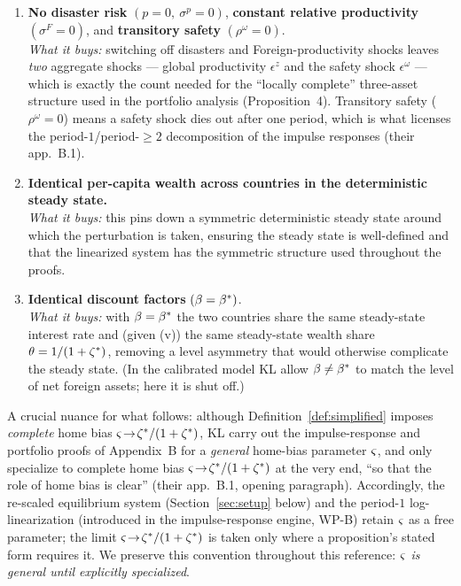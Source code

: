 \begin{definition}
\begin{enumerate}[label=(\roman*),leftmargin=2.0em,itemsep=3pt]
  $\Phi(\ell)$ linear in the relevant sense, simplifying the supply block.
  \item \textbf{No disaster risk} $(p=0,\ \sigma^p=0)$, \textbf{constant relative
  productivity} $(\sigma^F=0)$, and \textbf{transitory safety}
  $(\rho^\omega=0)$. \\[2pt]
  \emph{What it buys:} switching off disasters and Foreign-productivity shocks
  leaves \emph{two} aggregate shocks --- global productivity $\epsilon^z$ and the
  safety shock $\epsilon^\omega$ --- which is exactly the count needed for the
  ``locally complete'' three-asset structure used in the portfolio analysis
  (Proposition~4). Transitory safety ($\rho^\omega=0$) means a safety shock dies
  out after one period, which is what licenses the period-$1$/period-$\ge 2$
  decomposition of the impulse responses (their app.\ B.1).
  \item \textbf{Identical per-capita wealth across countries in the
  deterministic steady state.} \\[2pt]
  \emph{What it buys:} this pins down a symmetric deterministic steady state
  around which the perturbation is taken, ensuring the steady state is
  well-defined and that the linearized system has the symmetric structure used
  throughout the proofs.
  \item \textbf{Identical discount factors} $(\beta=\beta^{*})$. \\[2pt]
  \emph{What it buys:} with $\beta=\beta^{*}$ the two countries share the same
  steady-state interest rate and (given (v)) the same steady-state wealth share
  $\theta=1/(1+\zeta^{*})$, removing a level asymmetry that would otherwise complicate
  the steady state. (In the calibrated model KL allow $\beta\neq\beta^{*}$ to match
  the level of net foreign assets; here it is shut off.)
\end{enumerate}
\end{definition}

\begin{remark}
\label{rem:general-sigma}
A crucial nuance for what follows: although Definition~\ref{def:simplified}
imposes \emph{complete} home bias $\varsigma\!\to\!\zeta^{*}/(1+\zeta^{*})$, KL carry out the
impulse-response and portfolio proofs of Appendix~B for a \emph{general}
home-bias parameter $\varsigma$, and only specialize to complete home bias
$\varsigma\!\to\!\zeta^{*}/(1+\zeta^{*})$ at the very end, ``so that the role of home bias is
clear'' (their app.\ B.1, opening paragraph). Accordingly, the re-scaled
equilibrium system (Section~\ref{sec:setup} below) and the period-$1$
log-linearization (introduced in the impulse-response engine, WP-B) retain
$\varsigma$ as a free parameter; the limit $\varsigma\!\to\!\zeta^{*}/(1+\zeta^{*})$ is taken only
where a proposition's stated form requires it. We preserve this convention
throughout this reference: \emph{$\varsigma$ is general until explicitly
specialized}.
\end{remark}

